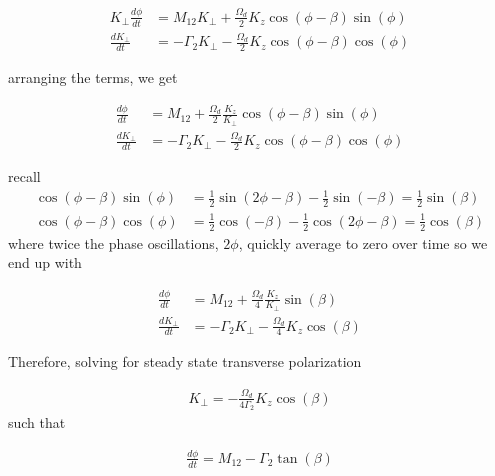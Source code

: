\documentclass{article}
\begin{document}
\begin{align}
      K_{\perp}\frac{d \phi}{dt} &=  M_{12}K_{\perp} +\frac{\Omega_d}{2} K_z \cos{\left(\phi-\beta\right)}\sin{\left(\phi\right)}\\
     \frac{d K_{\perp}}{dt}  &= -\Gamma_2 K_{\perp} - \frac{\Omega_d}{2} K_z \cos{\left(\phi-\beta\right)}\cos{\left(\phi\right)}
\end{align}

arranging the terms, we get

\begin{align}
      \frac{d \phi}{dt} &=  M_{12} +\frac{\Omega_d}{2} \frac{K_z}{K_{\perp}} \cos{\left(\phi-\beta\right)}\sin{\left(\phi\right)}\\
     \frac{d K_{\perp}}{dt}  &= -\Gamma_2 K_{\perp} - \frac{\Omega_d}{2} K_z \cos{\left(\phi-\beta\right)}\cos{\left(\phi\right)}
\end{align}

recall
\begin{align}
     \cos{\left(\phi-\beta\right)}\sin{\left(\phi\right)} &=\frac{1}{2}\sin{\left(2\phi-\beta\right)} - \frac{1}{2}\sin{\left(-\beta\right)} = \frac{1}{2}\sin{\left(\beta\right)}\\
     \cos{\left(\phi-\beta\right)}\cos{\left(\phi\right)} &= \frac{1}{2}\cos{\left(-\beta\right)} - \frac{1}{2}\cos{\left(2\phi-\beta\right)} = \frac{1}{2}\cos{\left(\beta\right)}
\end{align}
where twice the phase oscillations, $2\phi$, quickly average to zero over time so we end up with

\begin{align}
      \frac{d \phi}{dt} &=  M_{12} +\frac{\Omega_d}{4} \frac{K_z}{K_{\perp}}\sin{\left(\beta\right)}\\
     \frac{d K_{\perp}}{dt}  &= -\Gamma_2 K_{\perp} - \frac{\Omega_d}{4} K_z \cos{\left(\beta\right)}
\end{align}

Therefore, solving for steady state transverse polarization 

\begin{align}
     \boxed{K_{\perp} = -\frac{\Omega_d}{4\Gamma_2} K_z \cos{\left(\beta\right)}}
\end{align}
such that

\begin{align}
      \boxed{\frac{d \phi}{dt} =  M_{12} -\Gamma_2 \tan{\left(\beta\right)}}
\end{align}
\end{document}
